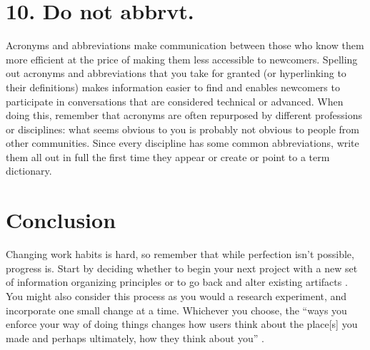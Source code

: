 \documentclass[10pt,letterpaper]{article}
\newcommand{\rulemajor}[1]{\section*{#1}}
\begin{document}
\rulemajor{10. Do not abbrvt.}

Acronyms and abbreviations make communication between those who know them more
efficient at the price of making them less accessible to newcomers. Spelling
out acronyms and abbreviations that you take for granted (or hyperlinking to
their definitions) makes information easier to find and enables newcomers
to participate in conversations that are considered technical or advanced. When 
doing this, remember that acronyms are often repurposed by
different professions or disciplines: what seems obvious to you is probably not
obvious to people from other communities. Since every discipline has some common
abbreviations, write them all out in full the first time they appear or create
or point to a term dictionary.

\section*{Conclusion}

Changing work habits is hard, so remember that while perfection isn't possible,
progress is. Start by deciding whether to begin your next project with a new set
of information organizing principles or to go back and alter existing artifacts
\cite{Briney2015}. You might also consider this process as you would a research 
experiment, and incorporate one small change at a time. Whichever you choose, the
``ways you enforce your way of doing things changes how users think about the 
place[s] you made and perhaps ultimately, how they think about you'' \cite{Covert2014}.


\end{document}
